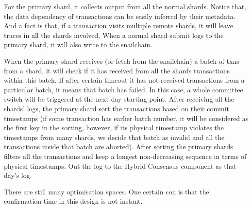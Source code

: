 For the primary shard, it collects output from all the normal shards. Notice that, the data dependency of transactions can be easily inferred by their metadata.
And a fact is that, if a transaction visits multiple remote shards, it will leave traces in all the shards involved. When a normal shard submit logs to the primary
shard, it will also write to the snailchain.

When the primary shard receives (or fetch from the snailchain) a batch of txns from a shard, it will check if it has received from all the shards transactions
within this batch. If after certain timeout it has not received transactions from a particular batch, it means that batch has failed. In this case, a whole committee
switch will be triggered at the next day starting point. After receiving all the shards' logs, the primary shard sort the transactions based on their commit
timestamps (if some transaction has earlier batch number, it will be considered as the first key in the sorting, however, if its physical timestamp violates
the timestamps from many shards, we decide that batch as invalid and all the transactions inside that batch are aborted). After sorting the primary shards
filters all the transactions and keep a longest non-decreasing sequence in terms of physical timestamps. Out the log to the Hybrid Consensus component as that
day's log.

There are still many optimisation spaces. One certain con is that the confirmation time in this design is not instant.
